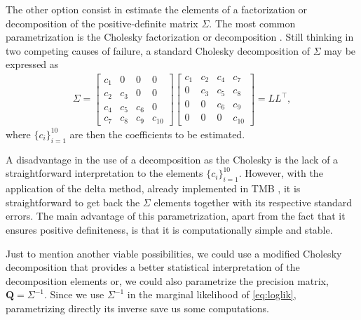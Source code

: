 The other option consist in estimate the elements of a factorization or
decomposition of the positive-definite matrix \(\Sigma\). The most
common parametrization is the Cholesky factorization or decomposition
\cite{cholesky}. Still thinking in two competing causes of failure, a
standard Cholesky decomposition of \(\Sigma\) may be expressed as
\begin{align*}
 \Sigma = \begin{bmatrix}
           c_{1}&0&0&0\\
           c_{2}&c_{3}&0&0\\
           c_{4}&c_{5}&c_{6}&0\\
           c_{7}&c_{8}&c_{9}&c_{10}
         \end{bmatrix}\begin{bmatrix}
                       c_{1}&c_{2}&c_{4}&c_{7}\\
                       0&c_{3}&c_{5}&c_{8}\\
                       0&0&c_{6}&c_{9}\\
                       0&0&0&c_{10}
                      \end{bmatrix} = LL^{\top},
\end{align*}
where \(\{c_{i}\}_{i=1}^{10}\) are then the coefficients to be estimated.

A disadvantage in the use of a decomposition as the Cholesky is the lack
of a straightforward interpretation to the elements
\(\{c_{i}\}_{i=1}^{10}\). However, with the application of the delta
method, already implemented in TMB \cite{TMB}, it is straightforward to
get back the \(\Sigma\) elements together with its respective standard
errors. The main advantage of this parametrization, apart from the fact
that it ensures positive definiteness, is that it is computationally
simple and stable.

Just to mention another viable possibilities, we could use a modified
Cholesky decomposition \cite{modifiedcholesky} that provides a better
statistical interpretation of the decomposition elements or, we could
also parametrize the precision matrix, \(\bm{Q} = \Sigma^{-1}\). Since
we use \(\Sigma^{-1}\) in the marginal likelihood of
\autoref{eq:loglik}, parametrizing directly its inverse save us some
computations.


